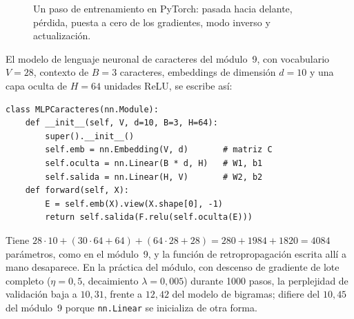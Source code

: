 \begin{figure}[h]
\centering
{}
\caption{Un paso de entrenamiento en PyTorch: pasada hacia delante, pérdida, puesta a cero de los gradientes, modo inverso y actualización.}
\label{fig:bucle}
\end{figure}

\begin{ejemplo}\label{ej:mlp-caracteres}
El modelo de lenguaje neuronal de caracteres del módulo~9, con vocabulario $V=28$, contexto de $B=3$ caracteres, embeddings de dimensión $d=10$ y una capa oculta de $H=64$ unidades ReLU, se escribe así:

\par\noindent\begin{minipage}{\linewidth}
{\small
\begin{verbatim}
class MLPCaracteres(nn.Module):
    def __init__(self, V, d=10, B=3, H=64):
        super().__init__()
        self.emb = nn.Embedding(V, d)       # matriz C
        self.oculta = nn.Linear(B * d, H)   # W1, b1
        self.salida = nn.Linear(H, V)       # W2, b2
    def forward(self, X):
        E = self.emb(X).view(X.shape[0], -1)
        return self.salida(F.relu(self.oculta(E)))
\end{verbatim}
}
\end{minipage}

Tiene $28\cdot 10+(30\cdot 64+64)+(64\cdot 28+28)=280+1984+1820=4084$ parámetros, como en el módulo~9, y la función de retropropagación escrita allí a mano desaparece. En la práctica del módulo, con descenso de gradiente de lote completo ($\eta=0{,}5$, decaimiento $\lambda=0{,}005$) durante 1000 pasos, la perplejidad de validación baja a $10{,}31$, frente a $12{,}42$ del modelo de bigramas; difiere del $10{,}45$ del módulo~9 porque \texttt{nn.Linear} se inicializa de otra forma.
\end{ejemplo}

